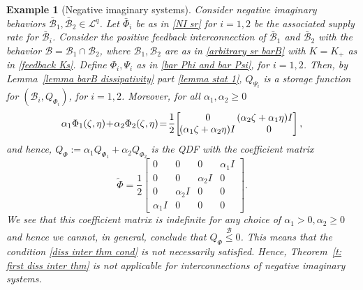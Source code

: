 \documentclass[letterpaper, 10 pt, conference]{ieeeconf}
\theoremstyle{ieeeconf}
\newtheorem{example}{Example}
\newcommand{\B}{\mathcal{B}}
\begin{document}
\begin{example}[Negative imaginary systems]
	Consider negative imaginary behaviors $\bar{\B}_1, \bar{\B}_2\in \mathcal{L}^q$. Let $\bar{\Phi}_i$ be as in \eqref{NI sr}
	for $i=1,2$ be the associated supply rate for $\bar{\B}_i$. Consider the positive feedback interconnection of $\bar{\B}_1$ and $\bar{\B}_2$ with the behavior $\B=\B_1\cap \B_2$, where $\B_1, \B_2$ are as in \eqref{arbitrary sr barB} with $K=K_+$ as in \eqref{feedback Ks}. 
	Define $\Phi_i,\Psi_i$ as in \eqref{bar Phi and bar Psi}, for $i=1,2$. Then, by Lemma~\ref{lemma barB dissipativity} part \ref{lemma stat 1}, $Q_{\Psi_i}$ is a storage function for $(\B_i,Q_{\Phi_i})$, for $i=1,2$. Moreover, for all $\alpha_1, \alpha_2\geq 0$
	\begin{gather*}
		\alpha_1\Phi_1(\zeta,\eta)\!+\!\alpha_2\Phi_2(\zeta,\eta)\!=\!\frac{1}{2}\!\begin{bmatrix}
			0 & \hspace{-2ex}(\alpha_2\zeta +\alpha_1\eta) I\\
			\hspace{-0.25ex}(\alpha_1\zeta+\alpha_2\eta)I & 0
		\end{bmatrix},
	\end{gather*}
	and hence, $Q_\Phi:=\alpha_1Q_{\Phi_1}+\alpha_2Q_{\Phi_2}$ is the QDF with the coefficient matrix
	\begin{equation*}
		\tilde{\Phi}=\frac{1}{2}\begin{bmatrix}
			0 & 0 & 0 & \alpha_1 I \\
			0 & 0 & \alpha_2 I & 0\\
			0 & \alpha_2 I & 0 & 0\\
			\alpha_1 I & 0 & 0 & 0
		\end{bmatrix}.
	\end{equation*}
	We see that this coefficient matrix is indefinite for any choice of $\alpha_1>0,\alpha_2\geq 0$ and hence we cannot, in general, conclude that ${Q_\Phi \stackrel{\B}{\leq }0}$. This means that the condition \eqref{diss inter thm cond} is not necessarily satisfied. Hence, Theorem~\ref{t: first diss inter thm} is not applicable for interconnections of negative imaginary systems.
	

\end{example}
\end{document}
